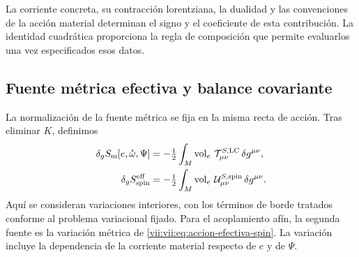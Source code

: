 La corriente concreta, su contracción lorentziana, la dualidad y las
convenciones de la acción material determinan el signo y el coeficiente
de esta contribución. La identidad cuadrática proporciona la regla de
composición que permite evaluarlos una vez especificados esos datos.

\subsection{Fuente métrica efectiva y balance covariante}
\label{vii:vii:subsec:fuente-metrica-efectiva}

La normalización de la fuente métrica se fija en la misma recta de
acción. Tras eliminar \(K\), definimos
\begin{align}
 \delta_g S_{\rm m}[e,\mathring\omega,\Psi]
 &=-\tfrac12\int_M\operatorname{vol}_e\,
                   \mathcal T^{S,\rm LC}_{\mu\nu}\,\delta g^{\mu\nu},
 \\
 \delta_g S_{\rm spin}^{\rm eff}
 &=-\tfrac12\int_M\operatorname{vol}_e\,
                   \mathcal U^{S,\rm spin}_{\mu\nu}\,\delta g^{\mu\nu}.
 \label{vii:vii:eq:fuentes-normalizadas-accion}
\end{align}
Aquí se consideran variaciones interiores, con los términos de borde
tratados conforme al problema variacional fijado. Para el acoplamiento
afín, la segunda fuente es la variación métrica de
\eqref{vii:vii:eq:accion-efectiva-spin}. La variación incluye la dependencia
de la corriente material respecto de \(e\) y de \(\Psi\).


